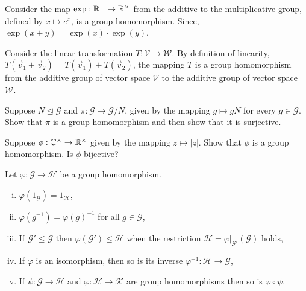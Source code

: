 \begin{exmp}
	Consider the map $\exp : \mathbb{R}^{+} \to \mathbb{R}^{\times}$ from the additive to the
	multiplicative group, defined by $x \mapsto e^x$, is a group homomorphism.
	Since, $\exp{(x + y)} = \exp{(x)} \cdot \exp{(y)}$.
\end{exmp}

\begin{exmp}
	Consider the linear transformation $T : \mathcal{V} \to \mathcal{W}$.
	By definition of linearity, $T(\vec{v}_1 + \vec{v}_2) = T(\vec{v}_1) + T(\vec{v}_2)$,
	the mapping $T$ is a group homomorphism from the additive group of vector space $\mathcal{V}$
	to the additive group of vector space $\mathcal{W}$.
\end{exmp}

\begin{prob}
	Suppose $N \unlhd \mathcal{G}$ and $\pi : \mathcal{G} \to \mathcal{G} / N$,
	given by the mapping $g \mapsto g N$ for every $g \in \mathcal{G}$. Show that $\pi$
	is a group homomorphism and then show that it is surjective.
\end{prob}

\begin{prob}
	Suppose $\phi : \mathbb{C}^{\times} \to \mathbb{R}^{\times}$ given by the mapping $z \mapsto | z |$. Show
	that $\phi$ is a group homomorphism. Is $\phi$ bijective?
\end{prob}

\begin{prop}
	Let $\varphi : \mathcal{G} \to \mathcal{H}$ be a group homomorphism.
	\begin{enumerate}[i.)]
		\item $\varphi(1_{\mathcal{G}}) = 1_{\mathcal{H}}$,
		\item $\varphi(g^{-1}) = \varphi(g)^{-1}$ for all $g \in \mathcal{G}$,
		\item If $\mathcal{G}' \leq \mathcal{G}$ then $\varphi(\mathcal{G}') \leq \mathcal{H}$ when the restriction
			$\mathcal{H} = \varphi |_{\mathcal{G}'} (\mathcal{G})$ holds,
		\item If $\varphi$ is an isomorphism, then so is its inverse $\varphi^{-1} : \mathcal{H} \to \mathcal{G}$,
		\item If $\psi : \mathcal{G} \to \mathcal{H}$ and $\varphi : \mathcal{H} \to \mathcal{K}$ are group
			homomorphisms then so is $\varphi \circ \psi$.
	\end{enumerate}
\end{prop}

